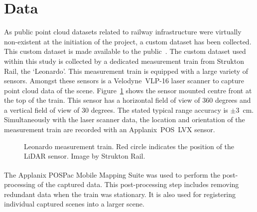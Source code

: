 \section{Data}
As public point cloud datasets related to railway infrastructure were virtually non-existent at the initiation of the project, a custom dataset has been collected. This custom dataset is made available to the public~\cite{ton2024dataset}. The custom dataset used within this study is collected by a dedicated measurement train from Strukton Rail, the `Leonardo'. This measurement train is equipped with a large variety of sensors. Amongst these sensors is a Velodyne~VLP-16 laser scanner to capture point cloud data of the scene. Figure~\ref{fig:objdet:leonardo} shows the sensor mounted centre front at the top of the train. This sensor has a horizontal field of view of 360 degrees and a vertical field of view of 30 degrees. The stated typical range accuracy is $\pm$3~cm. Simultaneously with the laser scanner data, the location and orientation of the measurement train are recorded with an Applanix~POS~LVX sensor.

\begin{figure}[ht]
\centering
{}
\caption{Leonardo measurement train. Red circle indicates the position of the LiDAR sensor. {\tiny Image by Strukton Rail.}}
\label{fig:objdet:leonardo}
\end{figure}

The Applanix POSPac\textsuperscript{\tiny\textregistered} Mobile Mapping Suite was used to perform the post-processing of the captured data. This post-processing step includes removing redundant data when the train was stationary. It is also used for registering individual captured scenes into a larger scene.

